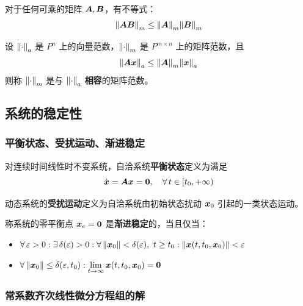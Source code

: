 对于任何可乘的矩阵 $\boldsymbol{A}, \boldsymbol{B}$，有不等式：
$$
\norm{\boldsymbol{A} \boldsymbol{B}}_m \le \norm{\boldsymbol{A}}_m \norm{\boldsymbol{B}}_m
$$

\begin{definition}[范数的相容]
    设 $\norm{\cdot}_a$ 是 $P^{n}$ 上的向量范数，$\norm{\cdot}_m$ 是 $P^{m \times n}$ 上的矩阵范数，且
    $$
    \norm{\boldsymbol{A} \boldsymbol{x}}_a \le \norm{\boldsymbol{A}}_m \norm{\boldsymbol{x}}_a
    $$
    则称 $\norm{\cdot}_m$ 是与 $\norm{\cdot}_a$ \textbf{相容}的矩阵范数。
\end{definition}

\subsection{系统的稳定性}

\subsubsection{平衡状态、受扰运动、渐进稳定}

\begin{definition}[平衡状态]
    对连续时间线性时不变系统，自洽系统\textbf{平衡状态}定义为满足
    $$
    \dot{\boldsymbol{x}} = \boldsymbol{A} \boldsymbol{x} = \boldsymbol{0},\quad \forall\,t \in [t_0, +\infty)
    $$
\end{definition}

\begin{definition}[受扰运动]
    动态系统的\textbf{受扰运动}定义为自洽系统由初始状态扰动 $\boldsymbol{x}_0$ 引起的一类状态运动。
\end{definition}

\begin{definition}[渐进稳定]
    称系统的零平衡点 $\boldsymbol{x}_e = \boldsymbol{0}$ 是\textbf{渐进稳定}的，当且仅当：
    \begin{itemize}
        \item $\forall\,\varepsilon > 0: \exists\,\delta(\varepsilon) > 0: \forall\, \norm{\boldsymbol{x}_0} < \delta(\varepsilon),\ t \ge t_0: \norm{\boldsymbol{x}(t, t_0, \boldsymbol{x}_0)} < \varepsilon$
        \item $\forall\, \norm{\boldsymbol{x}_0} \le \delta(\varepsilon, t_0): \lim\limits_{t \to \infty} \boldsymbol{x}(t, t_0, \boldsymbol{x}_0) = \boldsymbol{0}$
    \end{itemize}
\end{definition}

\subsubsection{常系数齐次线性微分方程组的解}

